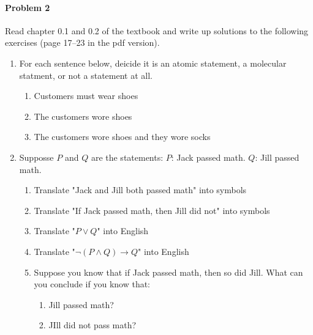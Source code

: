\documentclass[11pt, a4paper]{article}
\newcommand\setItemNumber[1]{\setcounter{enumi}{\numexpr#1-1\relax}}
\begin{document}
\paragraph{Problem 2} Read chapter 0.1 and 0.2 of the textbook and write up solutions to the following exercises (page 17--23 in the pdf version).


\begin{enumerate}
    \item For each sentence below, deicide it is an atomic statement, a molecular statment, or not a statement at all.
        \begin{enumerate}
            \item Customers must wear shoes
            \item The customers wore shoes
            \item The customers wore shoes and they wore socks
        \end{enumerate}
    
    \setItemNumber{3}
    \item Supposse $P$ and $Q$ are the statements: $P$: Jack passed math. $Q$: Jill passed math.
        \begin{enumerate}
            \item Translate "Jack and Jill both passed math" into symbols
            \item Translate "If Jack passed math, then Jill did not" into symbols
            \item Translate "$P \lor Q$" into English
            \item Translate "$ \neg(P \land Q) \rightarrow Q$" into English
            \item Suppose you know that if Jack passed math, then so did Jill. What can you conclude if you know that:
                \begin{enumerate}
                    \item Jill passed math?
                    \item JIll did not pass math?
                \end{enumerate}
        \end{enumerate}


\end{enumerate}
\end{document}
